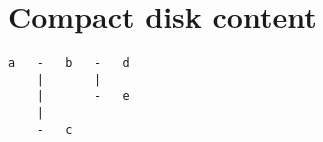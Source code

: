\chapter{Compact disk content}
\begin{lstlisting}[columns=fixed,basicstyle=\ttfamily\footnotesize,tabsize=4]
a   -   b   -   d
    |       |
    |       -   e
    |
    -   c
\end{lstlisting}
